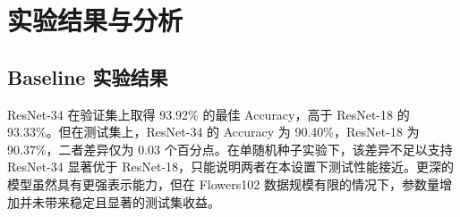 \documentclass[UTF8]{ctexart}
\begin{document}
\section{实验结果与分析}
\subsection{Baseline 实验结果}
\begin{table}[H]
\centering
\caption{Baseline 实验结果}
\label{tab:baseline-results}
\end{table}

ResNet-34 在验证集上取得 93.92\% 的最佳 Accuracy，高于 ResNet-18 的 93.33\%。但在测试集上，ResNet-34 的 Accuracy 为 90.40\%，ResNet-18 为 90.37\%，二者差异仅为 0.03 个百分点。在单随机种子实验下，该差异不足以支持 ResNet-34 显著优于 ResNet-18，只能说明两者在本设置下测试性能接近。更深的模型虽然具有更强表示能力，但在 Flowers102 数据规模有限的情况下，参数量增加并未带来稳定且显著的测试集收益。
\end{document}
